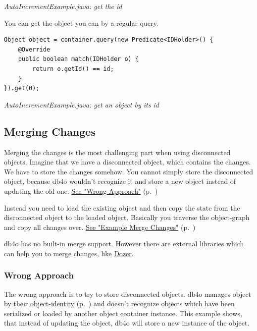 {\small\itshape AutoIncrementExample.java: get the id\par}
\medskip

You can get the object you can by a regular query.

\begin{lstlisting}
Object object = container.query(new Predicate<IDHolder>() {
    @Override
    public boolean match(IDHolder o) {
        return o.getId() == id;
    }
}).get(0);
\end{lstlisting}

{\small\itshape AutoIncrementExample.java: get an object by its id\par}
\medskip

\subsection{Merging Changes}
\label{ref:platform-specific-issues-disconnected-objects-merging-changes}

Merging the changes is the most challenging part when using disconnected objects. Imagine that we have a disconnected object, which contains the changes. We have to store the changes somehow. You cannot simply store the disconnected object, because db4o wouldn't recognize it and store a new object instead of updating the old one. \hyperref[ref:platform-specific-issues-disconnected-objects-wrong-approach]{See "Wrong Approach"} (p.~\pageref{ref:platform-specific-issues-disconnected-objects-wrong-approach})

Instead you need to load the existing object and then copy the state from the disconnected object to the loaded object. Basically you traverse the object-graph and copy all changes over. \hyperref[ref:platform-specific-issues-disconnected-objects-example-merge-changes]{See "Example Merge Changes"} (p.~\pageref{ref:platform-specific-issues-disconnected-objects-example-merge-changes})

db4o has no built-in merge support. However there are external libraries which can help you to merge changes, like  \href{http://dozer.sourceforge.net/}{Dozer}.

\subsubsection{Wrong Approach}
\label{ref:platform-specific-issues-disconnected-objects-wrong-approach}

The wrong approach is to try to store disconnected objects. db4o manages object by their \hyperref[ref:basics-identity-concept]{object-identity} (p.~\pageref{ref:basics-identity-concept}) and doesn't recognize objects which have been serialized or loaded by another object container instance. This example shows, that instead of updating the object, db4o will store a new instance of the object.

